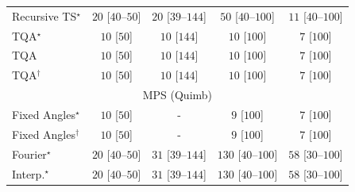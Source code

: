 \begin{tabular}{l|cccc|}
Recursive TS$^\star$ & {\cellcolor[HTML]{F5FBF2}} \color[HTML]{000000} $20$ [$40$--$50$] & {\cellcolor[HTML]{F5FBF2}} \color[HTML]{000000} $20$ [$39$--$144$] & {\cellcolor[HTML]{F0F9EC}} \color[HTML]{000000} $50$ [$40$--$100$] & {\cellcolor[HTML]{F6FCF4}} \color[HTML]{000000} $11$ [$40$--$100$] \\
TQA$^\star$ & {\cellcolor[HTML]{F7FCF5}} \color[HTML]{000000} $10$ [$50$] & {\cellcolor[HTML]{F7FCF5}} \color[HTML]{000000} $10$ [$144$] & {\cellcolor[HTML]{F7FCF5}} \color[HTML]{000000} $10$ [$100$] & {\cellcolor[HTML]{F7FCF5}} \color[HTML]{000000} $7$ [$100$] \\
TQA & {\cellcolor[HTML]{F7FCF5}} \color[HTML]{000000} $10$ [$50$] & {\cellcolor[HTML]{F7FCF5}} \color[HTML]{000000} $10$ [$144$] & {\cellcolor[HTML]{F7FCF5}} \color[HTML]{000000} $10$ [$100$] & {\cellcolor[HTML]{F7FCF5}} \color[HTML]{000000} $7$ [$100$] \\
TQA$^\dagger$ & {\cellcolor[HTML]{F7FCF5}} \color[HTML]{000000} $10$ [$50$] & {\cellcolor[HTML]{F7FCF5}} \color[HTML]{000000} $10$ [$144$] & {\cellcolor[HTML]{F7FCF5}} \color[HTML]{000000} $10$ [$100$] & {\cellcolor[HTML]{F7FCF5}} \color[HTML]{000000} $7$ [$100$] \\
\cline{1-5}
\multicolumn{5}{c}{\rule{0pt}{8pt}MPS (Quimb)} \\
\midrule
Fixed Angles$^\star$ & {\cellcolor[HTML]{F7FCF5}} \color[HTML]{000000} $10$ [$50$] & {\cellcolor[HTML]{000000}} \color[HTML]{F1F1F1} {\cellcolor{white}} \color{black} - & {\cellcolor[HTML]{F7FCF5}} \color[HTML]{000000} $9$ [$100$] & {\cellcolor[HTML]{F7FCF5}} \color[HTML]{000000} $7$ [$100$] \\
Fixed Angles$^\dagger$ & {\cellcolor[HTML]{F7FCF5}} \color[HTML]{000000} $10$ [$50$] & {\cellcolor[HTML]{000000}} \color[HTML]{F1F1F1} {\cellcolor{white}} \color{black} - & {\cellcolor[HTML]{F7FCF5}} \color[HTML]{000000} $9$ [$100$] & {\cellcolor[HTML]{F7FCF5}} \color[HTML]{000000} $7$ [$100$] \\
Fourier$^\star$ & {\cellcolor[HTML]{F5FBF2}} \color[HTML]{000000} $20$ [$40$--$50$] & {\cellcolor[HTML]{F3FAF0}} \color[HTML]{000000} $31$ [$39$--$144$] & {\cellcolor[HTML]{DFF3DA}} \color[HTML]{000000} $130$ [$40$--$100$] & {\cellcolor[HTML]{EFF9EB}} \color[HTML]{000000} $58$ [$30$--$100$] \\
Interp.$^\star$ & {\cellcolor[HTML]{F5FBF2}} \color[HTML]{000000} $20$ [$40$--$50$] & {\cellcolor[HTML]{F3FAF0}} \color[HTML]{000000} $31$ [$39$--$144$] & {\cellcolor[HTML]{DFF3DA}} \color[HTML]{000000} $130$ [$40$--$100$] & {\cellcolor[HTML]{EFF9EB}} \color[HTML]{000000} $58$ [$30$--$100$] \\

\end{tabular}
